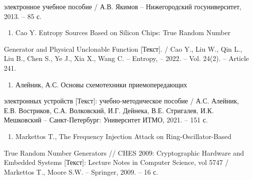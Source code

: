 электронное учебное пособие / А.В. Якимов -- Нижегородский
госуниверситет, 2013. -- 85 с.

\begin{enumerate}
\def\labelenumi{\arabic{enumi}.}
\setcounter{enumi}{11}
\item
  Cao Y. Entropy Sources Based on Silicon Chips: True Random Number
\end{enumerate}

Generator and Physical Unclonable Function {[}Текст{]}. / Cao Y., Liu
W., Qin L., Liu B., Chen S., Ye J., Xia X., Wang C. -- Entropy, -- 2022.
-- Vol. 24(2). -- Article 241.

\begin{enumerate}
\def\labelenumi{\arabic{enumi}.}
\setcounter{enumi}{12}
\item
  Алейник, А.С. Основы схемотехники приемопередающих
\end{enumerate}

электронных устройств {[}Текст{]}: учебно-методическое пособие / А.С.
Алейник, Е.В. Востриков, С.А. Волковский, И.Г. Дейнека, В.Е. Стригалев,
И.К. Мешковский -- Санкт-Петербург: Университет ИТМО, 2021. -- 151 с.

\begin{enumerate}
\def\labelenumi{\arabic{enumi}.}
\setcounter{enumi}{13}
\item
  Markettos T., The Frequency Injection Attack on Ring-Oscillator-Based
\end{enumerate}

True Random Number Generators // CHES 2009: Cryptographic Hardware and
Embedded Systems {[}Текст{]}: Lecture Notes in Computer Science, vol
5747 / Markettos T., Moore S.W. -- Springer, 2009. -- 16 с.

